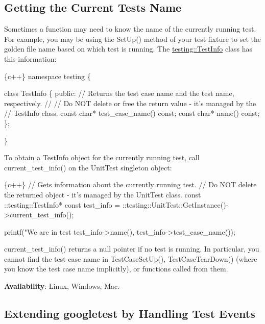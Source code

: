 \subsection*{Getting the Current Test\textquotesingle{}s Name}

Sometimes a function may need to know the name of the currently running test. For example, you may be using the {\ttfamily Set\+Up()} method of your test fixture to set the golden file name based on which test is running. The {\ttfamily \mbox{\hyperlink{classtesting_1_1_test_info}{testing\+::\+Test\+Info}}} class has this information\+:


\begin{DoxyCode}
\{c++\}
namespace testing \{

class TestInfo \{
 public:
  // Returns the test case name and the test name, respectively.
  //
  // Do NOT delete or free the return value - it's managed by the
  // TestInfo class.
  const char* test\_case\_name() const;
  const char* name() const;
\};

\}
\end{DoxyCode}


To obtain a {\ttfamily Test\+Info} object for the currently running test, call {\ttfamily current\+\_\+test\+\_\+info()} on the {\ttfamily Unit\+Test} singleton object\+:


\begin{DoxyCode}
\{c++\}
  // Gets information about the currently running test.
  // Do NOT delete the returned object - it's managed by the UnitTest class.
  const ::testing::TestInfo* const test\_info =
    ::testing::UnitTest::GetInstance()->current\_test\_info();



  printf("We are in test %
         test\_info->name(),
         test\_info->test\_case\_name());
\end{DoxyCode}


{\ttfamily current\+\_\+test\+\_\+info()} returns a null pointer if no test is running. In particular, you cannot find the test case name in {\ttfamily Test\+Case\+Set\+Up()}, {\ttfamily Test\+Case\+Tear\+Down()} (where you know the test case name implicitly), or functions called from them.

{\bfseries Availability}\+: Linux, Windows, Mac.

\subsection*{Extending googletest by Handling Test Events}

